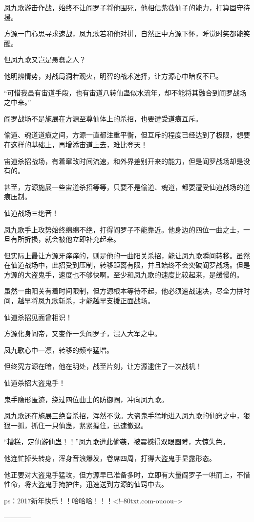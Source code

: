 \begin{this_body}
凤九歌游击作战，始终不让阎罗子将他围死，他相信紫薇仙子的能力，打算固守待援。

方源一门心思寻求速战，凤九歌若和他对拼，自然正中方源下怀，睡觉时笑都能笑醒。

但凤九歌又岂是愚蠢之人？

他明辨情势，对战局洞若观火，明智的战术选择，让方源心中暗叹不已。

“可惜我虽有宙道手段，也有宙道八转仙蛊似水流年，却不能将其融合到阎罗战场之中来。”

阎罗战场不是施展在方源至尊仙体上的杀招，也要遭受道痕互斥。

偷道、魂道道痕之间，方源一直都注重平衡，但互斥的程度已经达到了极限，想要在这样的基础上，再增添宙道上去，难比登天！

宙道杀招战场，有着窜改时间流速，和外界差别开来的能力，但是阎罗战场却是没有的。

甚至，方源施展一些宙道杀招等等，只要不是偷道、魂道，都要遭受仙道战场的道痕压制。

仙道战场三绝音！

凤九歌手上攻势始终绵绵不绝，打得阎罗子不能靠近。他身边的四位一曲之士，一旦有所折损，就会被他立即补充起来。

但实际上最让方源牙痒痒的，则是他的一曲阳关杀招，能让凤九歌瞬间转移。虽然在仙道战场中，此招受到压制，转移距离有限，并且始终不会突破阎罗战场。但是方源的大盗鬼手，速度也不够快啊。至少和凤九歌的速度比较起来，是缓慢的。

虽然一曲阳关有着时间限制，但方源根本等待不起，他必须速战速决，尽全力拼时间，越早将凤九歌斩杀，才能越早支援正面战场。

仙道杀招见面曾相识！

方源化身阎帝，又变作一头阎罗子，混入大军之中。

凤九歌心中一凛，转移的频率猛增。

但终究方源在暗，他在明处，战至片刻，让方源逮住了一次战机！

仙道杀招大盗鬼手！

鬼手隐形匿迹，绕过四位曲士的防御圈，冲向凤九歌。

凤九歌还在施展三绝音杀招，浑然不觉。大盗鬼手猛地进入凤九歌的仙窍之中，狠狠一抓，抓住一只仙蛊，紧紧握住，迅速撤退。

“糟糕，定仙游仙蛊！！”凤九歌遭此偷袭，被震撼得双眼圆瞪，大惊失色。

他连忙掉头转身，浑身音浪爆发，卷席四周，打得大盗鬼手显露形态。

他正要对大盗鬼手猛攻，但方源早已准备多时，立即有大量阎罗子一哄而上，不惜性命，将大盗鬼手掩护住，迅速送到方源的仙窍中去。

ps：2017新年快乐！！哈哈哈！！！<!--80txt.com-ouoou-->

------------

\end{this_body}


